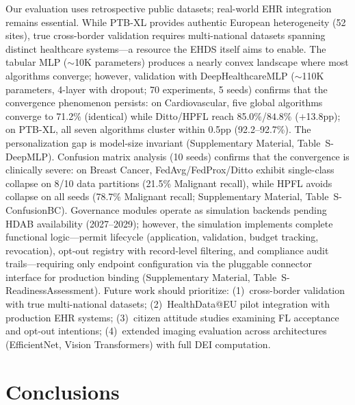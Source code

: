 \documentclass[conference]{IEEEtran}
\begin{document}
Our evaluation uses retrospective public datasets; real-world EHR integration remains essential. While PTB-XL provides authentic European heterogeneity (52 sites), true cross-border validation requires multi-national datasets spanning distinct healthcare systems---a resource the EHDS itself aims to enable. The tabular MLP ($\sim$10K parameters) produces a nearly convex landscape where most algorithms converge; however, validation with DeepHealthcareMLP ($\sim$110K parameters, 4-layer with dropout; 70 experiments, 5 seeds) confirms that the convergence phenomenon persists: on Cardiovascular, five global algorithms converge to 71.2\% (identical) while Ditto/HPFL reach 85.0\%/$84.8$\% ($+$13.8pp); on PTB-XL, all seven algorithms cluster within 0.5pp (92.2--92.7\%). The personalization gap is model-size invariant (Supplementary Material, Table~S-DeepMLP). Confusion matrix analysis (10 seeds) confirms that the convergence is clinically severe: on Breast Cancer, FedAvg/FedProx/Ditto exhibit single-class collapse on 8/10 data partitions (21.5\% Malignant recall), while HPFL avoids collapse on all seeds (78.7\% Malignant recall; Supplementary Material, Table~S-ConfusionBC). Governance modules operate as simulation backends pending HDAB availability (2027--2029); however, the simulation implements complete functional logic---permit lifecycle (application, validation, budget tracking, revocation), opt-out registry with record-level filtering, and compliance audit trails---requiring only endpoint configuration via the pluggable connector interface for production binding (Supplementary Material, Table~S-ReadinessAssessment). Future work should prioritize: (1)~cross-border validation with true multi-national datasets; (2)~HealthData@EU pilot integration with production EHR systems; (3)~citizen attitude studies examining FL acceptance and opt-out intentions; (4)~extended imaging evaluation across architectures (EfficientNet, Vision Transformers) with full DEI computation.

\section{Conclusions}
\label{sec:conclusions}
\end{document}
